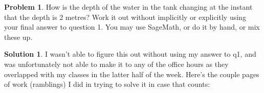 \documentclass[10pt]{article}
\theoremstyle{definition}
\newtheorem{problem}{Problem}
\newtheorem{soln}{Solution}
\begin{document}
\begin{problem}
How is the depth of the water in the tank changing at the instant that the depth is 2 metres?
Work it out without implicitly or explicitly using your final answer to question 1. You may
use SageMath, or do it by hand, or mix these up.
\end{problem}
\begin{soln}
    I wasn't able to figure this out without using my answer to q1, and was unfortunately not able to make it to any of the
    office hours as they overlapped with my classes in the latter half of the week. Here's the couple pages of work (ramblings) I did in trying to solve it in case that counts:
    

\end{soln}
\end{document}
